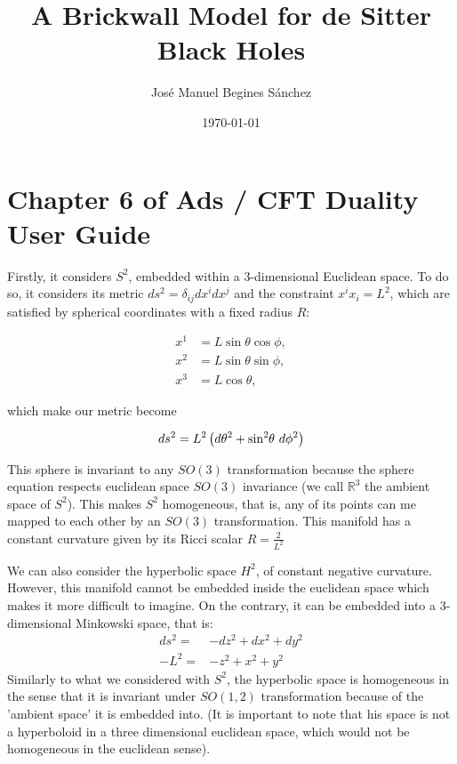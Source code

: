 \documentclass[12pt]{article}
\title{A Brickwall Model for de Sitter Black Holes}
\author{José Manuel Begines Sánchez}
\date{\today}
\begin{document}
\maketitle

\section{Chapter 6 of Ads / CFT Duality User Guide}

Firstly, it considers \( S^2 \), embedded within a 3-dimensional Euclidean space. To do so, it considers its metric \( ds^2 = \delta_{ij} dx^i dx^j \) and the constraint \( x^i x_i = L^2 \), which are satisfied by spherical coordinates with a fixed radius \( R \):

\begin{equation}
\begin{aligned}
    x^1 &= L \sin{ \theta } \cos{ \phi }, \\
    x^2 &= L \sin{ \theta } \sin{ \phi }, \\
    x^3 &= L \cos{ \theta },
\end{aligned}
\end{equation}

which make our metric become

\begin{equation}
    ds^2 = L^2 \left( d\theta^2 + \sin^2{ \hspace{-2pt}\theta } ~ d\phi^2 \right)
\end{equation}

This sphere is invariant to any \( SO(3) \) transformation because the sphere equation respects euclidean space \( SO(3) \) invariance (we call \(\mathbb{R}^3\) the ambient space of \( S^2 \)). This makes \( S^2 \) homogeneous, that is, any of its points can me mapped to each other by an \( SO(3) \) transformation. This manifold has a constant curvature given by its Ricci scalar \( R = \frac{2}{L^2} \)

\vspace{0.5cm}

We can also consider the hyperbolic space \( H^2 \), of constant negative curvature. However, this manifold cannot be embedded inside the euclidean space which makes it more difficult to imagine. On the contrary, it can be embedded into a 3-dimensional Minkowski space, that is:
\begin{align}
    ds^2 = & - dz^2 + dx^2 + dy^2 \\
    -L^2 = & - z^2 + x^2 + y^2
\end{align}
Similarly to what we considered with \( S^2 \), the hyperbolic space is homogeneous in the sense that it is invariant under \( SO(1,2) \) transformation because of the 'ambient space' it is embedded into. (It is important to note that his space is not a hyperboloid in a three dimensional euclidean space, which would not be homogeneous in the euclidean sense).
\end{document}
